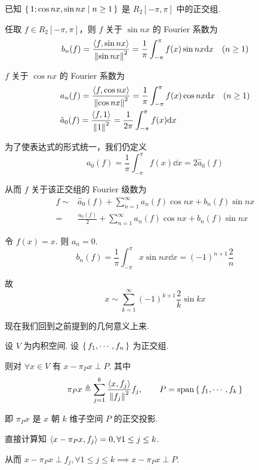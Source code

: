 \begin{example}
    已知 $\set{1;\cos nx,\sin nx|n\ge 1}$ 是 $R_2[-\pi,\pi]$ 中的正交组.

    任取 $f\in R_2[-\pi,\pi]$，则 $f$ 关于 $\sin nx$ 的 Fourier 系数为
$$
b_n(f)=\frac{\left\langle{f,\sin nx}\right\rangle}{\left\lVert{\sin nx}\right\rVert^2}=\frac{1}{\pi}\int_{-\pi}^\pi f(x)\sin nx\mathrm{d} x\quad(n\ge 1)
$$

    $f$ 关于 $\cos nx$ 的 Fourier 系数为
$$
\begin{aligned}
    &a_n(f)=\frac{\left\langle{f,\cos nx}\right\rangle}{\left\lVert{\cos nx}\right\rVert^2}=\frac{1}{\pi}\int_{-\pi}^\pi f(x)\cos nx\mathrm{d} x\quad(n\ge 1)\\
    &\hat{a}_0(f)=\frac{\left\langle{f,1}\right\rangle}{\left\lVert{1}\right\rVert^2}=\frac{1}{2\pi}\int_{-\pi}^{\pi}f(x)\mathrm{d} x
\end{aligned}
$$

    为了使表达式的形式统一，我们仍定义
$$
a_0(f)=\frac{1}{\pi}\int_{-\pi}^{\pi}f(x)\dd x=2\hat{a}_0(f)
$$

    从而 $f$ 关于该正交组的 Fourier 级数为
$$
\begin{aligned}
    f\sim&\hat{a}_0(f)+\sum_{n=1}^\infty a_n(f)\cos nx+b_n(f)\sin nx\\
    =&\frac{a_0(f)}{2}+\sum_{n=1}^\infty a_n(f)\cos nx+b_n(f)\sin nx
\end{aligned}
$$
\end{example}

\begin{example}
    令 $f(x)=x$. 则 $a_n=0$.
$$
b_n(f)=\frac{1}{\pi}\int_{-\pi}^{\pi}x\sin nx\dd x=(-1)^{n+1}\frac{2}{n}
$$

    故
$$
x\sim\sum_{k=1}^\infty (-1)^{k+1}\frac{2}{k}\sin kx
$$
\end{example}


现在我们回到之前提到的几何意义上来.

\begin{property}
    设 $V$ 为内积空间. 设 $\set{f_1,\cdots,f_n}$ 为正交组.

    则对 $\forall x\in V$ 有 $x-\pi_Px\perp P$. 其中
$$
\pi_Px\triangleq\sum_{j=1}^k\frac{\left\langle{x,f_j}\right\rangle}{\left\lVert{f_j}\right\rVert^2}f_j,\qquad P=\mathrm{span}\set{f_1,\cdots,f_k}
$$

    即 $\pi_Px$ 是 $x$ 朝 $k$ 维子空间 $P$ 的正交投影.
\end{property}
\begin{property}
    直接计算知 $\left\langle{x-\pi_Px,f_j}\right\rangle=0,\forall 1\le j\le k$.

    从而 $x-\pi_Px\perp f_j,\forall 1\le j\le k\implies x-\pi_Px\perp P$.
\end{property}

